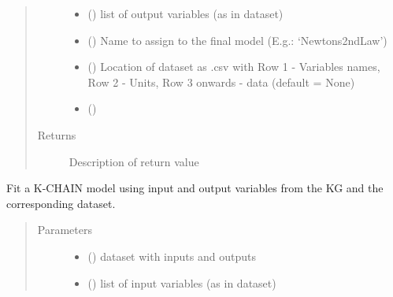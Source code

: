 \documentclass[letterpaper,10pt,english]{sphinxmanual}
\begin{document}
\begin{fulllineitems}
\begin{fulllineitems}
\begin{quote}
\begin{description}
\begin{itemize}
\item {} 
 () \textendash{} list of output variables (as in dataset)

\item {} 
 () \textendash{} Name to assign to the final model (E.g.: ‘Newtons2ndLaw’)

\item {} 
 () \textendash{} Location of dataset as .csv with Row 1 - Variables names,
Row 2 - Units, Row 3 onwards - data (default = None)

\item {} 
 () \textendash{} 

\end{itemize}

\item[{Returns}] \leavevmode
Description of return value

\end{description}\end{quote}

\end{fulllineitems}


\begin{fulllineitems}
\label{\detokenize{index:kChain.kChainModel.fitModel}}
Fit a K-CHAIN model using input and output variables from the KG and
the corresponding dataset.
\begin{quote}\begin{description}
\item[{Parameters}] \leavevmode\begin{itemize}
\item {} 
 () \textendash{} dataset with inputs and outputs

\item {} 
 () \textendash{} list of input variables (as in dataset)


\end{itemize}
\end{description}
\end{quote}
\end{fulllineitems}
\end{fulllineitems}
\end{document}
